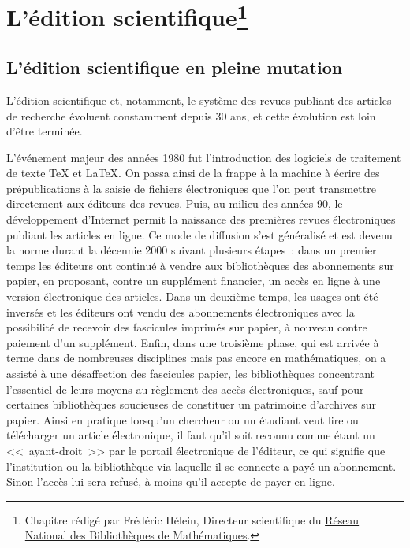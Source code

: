 \chapter{L'{\'e}dition scientifique\protect\footnote{Chapitre r\'edig\'e par Fr\'ed\'eric H\'elein, Directeur scientifique du \href{http://www.rnbm.org/}{R\'eseau National des Biblioth\`eques de Math\'ematiques}.}}
 
\section{L'{\'e}dition scientifique en pleine mutation}

L'{\'e}dition scientifique et, notamment, le syst{\`e}me des revues publiant des articles de recherche {\'e}voluent constamment
depuis 30 ans, et cette {\'e}volution est loin d'{\^e}tre termin{\'e}e.

L'{\'e}v{\'e}nement majeur des ann{\'e}es 1980 fut l'introduction des logiciels de traitement de texte TeX et LaTeX. On passa ainsi de la frappe
{\`a} la machine {\`a} {\'e}crire des pr{\'e}publications {\`a} la saisie de fichiers {\'e}lectroniques que l'on peut transmettre directement aux {\'e}diteurs des
revues. Puis, au milieu des ann{\'e}es 90, le d{\'e}veloppement d'Internet permit la naissance des premi{\`e}res revues {\'e}lectroniques publiant les
articles en ligne. Ce mode de diffusion s'est g{\'e}n{\'e}ralis{\'e} et est devenu la norme durant la d{\'e}cennie 2000 suivant plusieurs {\'e}tapes~: dans un
premier temps les {\'e}diteurs ont continu{\'e} {\`a} vendre aux biblioth{\`e}ques des abonnements sur papier, en proposant, contre un suppl{\'e}ment financier,
un acc{\`e}s en ligne {\`a} une version {\'e}lectronique des articles. Dans un deuxi{\`e}me temps, les usages ont {\'e}t{\'e} invers{\'e}s et les {\'e}diteurs ont vendu des
abonnements {\'e}lectroniques avec la possibilit{\'e} de recevoir des fascicules imprim{\'e}s sur papier, {\`a} nouveau contre paiement d'un suppl{\'e}ment.
Enfin, dans une troisi{\`e}me phase, qui est arriv{\'e}e {\`a} terme dans de nombreuses disciplines mais pas encore en math{\'e}matiques, on a assist{\'e} {\`a}
une d{\'e}saffection des fascicules papier, les biblioth{\`e}ques concentrant l'essentiel de leurs moyens au r{\`e}glement des acc{\`e}s {\'e}lectroniques,
sauf pour certaines biblioth{\`e}ques soucieuses de constituer un patrimoine d'archives sur papier. Ainsi en pratique lorsqu'un chercheur
ou un {\'e}tudiant veut lire ou t{\'e}l{\'e}charger un article {\'e}lectronique, il faut qu'il soit reconnu comme {\'e}tant un <<~ayant-droit~>> par le portail
{\'e}lectronique de l'{\'e}diteur, ce qui signifie que l'institution ou la biblioth{\`e}que via laquelle il se connecte a pay{\'e} un abonnement. Sinon
l'acc{\`e}s lui sera refus{\'e}, {\`a} moins qu'il accepte de payer en ligne.

